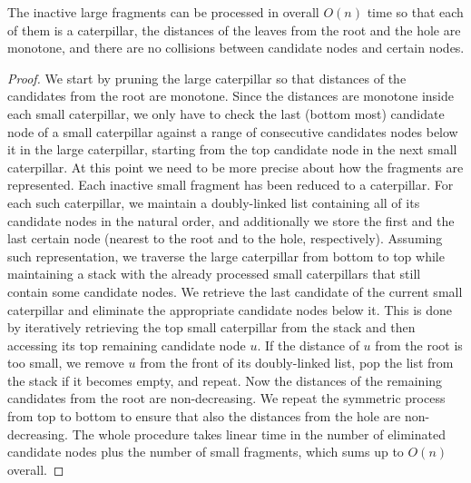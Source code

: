 \documentclass[a4paper,UKenglish]{lipics-v2016}
\theoremstyle{plain}
\begin{document}
\begin{lemma}\label{lemma3}
	The inactive large fragments can be processed in overall $O(n)$ time so that each of them is a caterpillar, the distances of the leaves from the root and the hole are monotone, and there are no collisions between candidate nodes and certain nodes.
\end{lemma}
\begin{proof}

We start by pruning the large caterpillar so that distances of the candidates from the root are
monotone. Since the distances are monotone inside each small caterpillar, we only have to check the last (bottom most) 
candidate node of a small caterpillar against a range of consecutive candidates nodes below it in the large
caterpillar, starting from the top candidate node in the next small caterpillar. 
At this point we need to be more precise about how the fragments are represented. Each inactive small
fragment has been reduced to a caterpillar. For each such caterpillar, we maintain a doubly-linked list containing
all of its candidate nodes in the natural order, and additionally we store the first and the last certain
node (nearest to the root and to the hole, respectively). Assuming such representation, we traverse
the large caterpillar from bottom to top while
maintaining a stack with the already processed small caterpillars that still contain some candidate nodes.
We retrieve the last candidate of the current small caterpillar and eliminate the appropriate candidate
nodes below it. This is done by iteratively retrieving the top small caterpillar from the stack and then
accessing its top remaining candidate node $u$. If the distance of $u$ from the root is too small, we
remove $u$ from the front of its doubly-linked list, pop the list from the stack if it becomes empty,
and repeat. Now the distances of the remaining candidates from the root are
non-decreasing. We repeat the symmetric process from top to bottom to ensure that also the distances
from the hole are non-decreasing. The whole procedure takes linear time in the number of eliminated
candidate nodes plus the number of small fragments, which sums up to $O(n)$ overall.


\end{proof}
\end{document}
